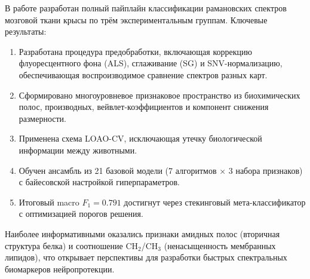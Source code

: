 \documentclass[12pt, a4paper]{article}
\begin{document}
В работе разработан полный пайплайн классификации рамановских спектров
мозговой ткани крысы по трём экспериментальным группам.
Ключевые результаты:

\begin{enumerate}[leftmargin=1.5cm]
  \item Разработана процедура предобработки, включающая коррекцию
        флуоресцентного фона (ALS), сглаживание (SG) и SNV-нормализацию,
        обеспечивающая воспроизводимое сравнение спектров разных карт.
  \item Сформировано многоуровневое признаковое пространство из биохимических
        полос, производных, вейвлет-коэффициентов и компонент
        снижения размерности.
  \item Применена схема LOAO-CV, исключающая утечку биологической
        информации между животными.
  \item Обучен ансамбль из 21 базовой модели (7 алгоритмов × 3 набора
        признаков) с байесовской настройкой гиперпараметров.
  \item Итоговый macro $F_1 = 0.791$ достигнут через стекинговый
        мета-классификатор с оптимизацией порогов решения.
\end{enumerate}

Наиболее информативными оказались признаки амидных полос
(вторичная структура белка) и соотношение CH$_2$/CH$_3$
(ненасыщенность мембранных липидов), что открывает перспективы
для разработки быстрых спектральных биомаркеров нейропротекции.
\end{document}
